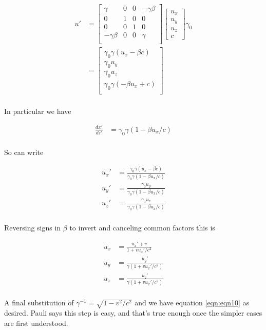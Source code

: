 \documentclass{article}
\begin{document}
\begin{align*}
u'
&=
\begin{bmatrix}
\gamma & 0 & 0 & - \gamma \beta \\
0 & 1 & 0 & 0 \\
0 & 0 & 1 & 0 \\
- \gamma \beta & 0 & 0 & \gamma \\
\end{bmatrix}
\begin{bmatrix}
u_x \\
u_y \\
u_z \\
c
\end{bmatrix}
\gamma_0 \\
&=
\begin{bmatrix}
\gamma_0 \gamma (u_x - \beta c) \\
\gamma_0 u_y \\
\gamma_0 u_z \\
\gamma_0 \gamma ( -\beta u_x + c ) \\
\end{bmatrix} \\
\end{align*}

In particular we have

\begin{align*}
\frac{dx'}{d\tau'} &= \gamma_0 \gamma ( 1 -\beta u_x/c ) \\
\end{align*}

So can write

\begin{align*}
u_x' &=
\frac{\gamma_0 \gamma (u_x - \beta c) }
{\gamma_0 \gamma ( 1 -\beta u_x/c )} \\
u_y' &=
\frac{\gamma_0 u_y }
{\gamma_0 \gamma ( 1 -\beta u_x/c )} \\
u_z' &=
\frac{\gamma_0 u_z }
{\gamma_0 \gamma ( 1 -\beta u_x/c )} \\
\end{align*}

Reversing signs in $\beta$ to invert and canceling common factors this is

\begin{align*}
u_x &=
\frac{u_x' + v }
{ 1 + v u_x'/c^2 } \\
u_y &=
\frac{u_y' }
{\gamma ( 1 + v u_x'/c^2 )} \\
u_z &=
\frac{u_z' }
{\gamma ( 1 + v u_x'/c^2 )} \\
\end{align*}

A final substitution of $\gamma^{-1} = \sqrt{1 - v^2/c^2}$ and we have
equation \ref{eqn:eqn10} as desired.  Pauli says this step is easy, and that's
true enough once the simpler cases are first understood.



\end{document}
